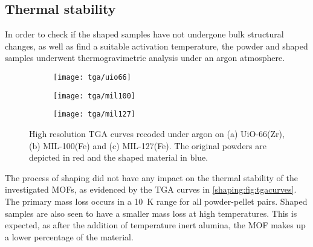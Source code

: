 
\subsection{Thermal stability}

In order to check if the shaped samples have not undergone bulk
structural changes, as well as find a suitable activation temperature,
the powder and shaped samples underwent thermogravimetric analysis
under an argon atmosphere.

\begin{figure}
	\centering
	\begin{subfigure}{0.85\textwidth}
		\parbox[c]{0.1\linewidth}{\caption{}\label{shaping:fig:tgauio66}}%
		\parbox[b]{0.7\linewidth}{%
			\texttt{[image: tga/uio66]}%
		}%
	\end{subfigure}%

	\begin{subfigure}{0.85\textwidth}
		\parbox[c]{0.1\linewidth}{\caption{}\label{shaping:fig:tgamil100}}%
		\parbox[b]{0.7\linewidth}{%
			\texttt{[image: tga/mil100]}%
		}%
	\end{subfigure}%
	
	\begin{subfigure}{0.85\textwidth}
		\parbox[c]{0.1\linewidth}{\caption{}\label{shaping:fig:tgamil127}}%
		\parbox[b]{0.7\linewidth}{%
			\texttt{[image: tga/mil127]}%
		}%
	\end{subfigure}%

	\caption{High resolution TGA curves recoded under argon
		on (a) UiO-66(Zr), (b) MIL-100(Fe) and (c) MIL-127(Fe). The
		original powders are depicted in red and the shaped material
		in blue.}%
	\label{shaping:fig:tgacurves}

\end{figure}

The process of shaping did not have any impact on the thermal stability of
the investigated MOFs, as evidenced by the TGA curves in
\autoref{shaping:fig:tgacurves}. The primary mass loss occurs
in a \SI{10}{\kelvin} range for all powder-pellet pairs.
Shaped samples are also seen to have a smaller mass loss
at high temperatures. This is expected, as after the addition of
temperature inert alumina, the MOF makes up a lower percentage of
the material.